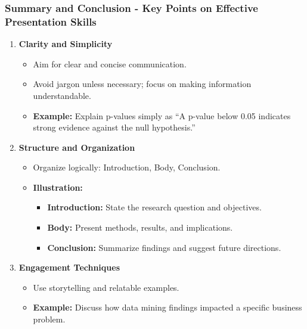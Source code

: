 \documentclass[aspectratio=169]{beamer}
\begin{document}
\begin{frame}[fragile]
    \frametitle{Summary and Conclusion - Key Points on Effective Presentation Skills}
    
    \begin{enumerate}
        \item \textbf{Clarity and Simplicity}
            \begin{itemize}
                \item Aim for clear and concise communication. 
                \item Avoid jargon unless necessary; focus on making information understandable.
                \item \textbf{Example:} Explain p-values simply as “A p-value below 0.05 indicates strong evidence against the null hypothesis.”
            \end{itemize}
        
        \item \textbf{Structure and Organization}
            \begin{itemize}
                \item Organize logically: Introduction, Body, Conclusion.
                \item \textbf{Illustration:}
                    \begin{itemize}
                        \item \textbf{Introduction:} State the research question and objectives.
                        \item \textbf{Body:} Present methods, results, and implications.
                        \item \textbf{Conclusion:} Summarize findings and suggest future directions.
                    \end{itemize}
            \end{itemize}
        
        \item \textbf{Engagement Techniques}
            \begin{itemize}
                \item Use storytelling and relatable examples.
                \item \textbf{Example:} Discuss how data mining findings impacted a specific business problem.
            \end{itemize}
    \end{enumerate}
\end{frame}
\end{document}
